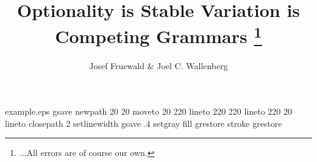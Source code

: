 %
%
%
%
%
\begin{filecontents*}{example.eps}
gsave
newpath
  20 20 moveto
  20 220 lineto
  220 220 lineto
  220 20 lineto
closepath
2 setlinewidth
gsave
  .4 setgray fill
grestore
stroke
grestore
\end{filecontents*}
%
\RequirePackage{fix-cm}
%
\documentclass{svjour3}                     %
%
\smartqed  %
%
\usepackage{mhsetup}
\usepackage{amsmath}
\usepackage{mathtools}
\usepackage{natbib}
\usepackage{graphicx}
\usepackage{float}
\usepackage{qtree}
\usepackage[utf8]{inputenc}
\usepackage{gb4e}
\usepackage[T1]{fontenc}
\newcommand{\noteme}[1]{\noindent \textbf{[[JCW:  #1 ]]}}
\renewcommand{\theequation}{\Alph{equation}}




\title{Optionality is Stable Variation is Competing Grammars
\thanks{...All errors are of course our own.}}


\author{Josef Fruewald \& Joel C. Wallenberg}



